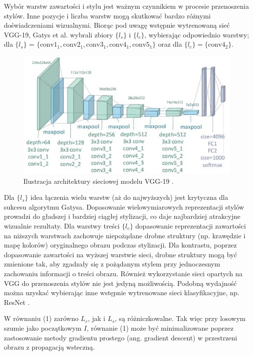 \documentclass[12pt]{article}
\begin{document}
Wybór warstw zawartości i stylu jest ważnym czynnikiem w procesie przenoszenia stylów. Inne pozycje i liczba warstw mogą skutkować bardzo różnymi doświadczeniami wizualnymi. Biorąc pod uwagę wstępnie wytrenowaną sieć VGG-19, Gatys et al. wybrali zbiory $\{l_s\}$ i $\{l_c\}$, wybierając odpowiednio warstwy; dla $\{l_s\}$ = $\{\text{conv}1_1, \text{conv}2_1, \text{conv}3_1, \text{conv}4_1, \text{conv}5_1\}$ oraz dla $\{l_c\} = \{\text{conv}4_2\}$.
\begin{figure}[H]
    \centering
    \includegraphics[scale=0.65]{u9.png}
    \caption{Ilustracja architektury sieciowej modelu VGG-19 \cite{31}.}
    \label{fig:6}
\end{figure}

Dla $\{l_s\}$ idea łączenia wielu warstw (aż do najwyższych) jest krytyczna dla sukcesu algorytmu Gatysa. Dopasowanie wielowymiarowych reprezentacji stylów prowadzi do gładszej i bardziej ciągłej stylizacji, co daje najbardziej atrakcyjne wizualnie rezultaty. Dla warstwy treści $\{l_c\}$ dopasowanie reprezentacji zawartości na niższych warstwach zachowuje niepożądane drobne struktury (np. krawędzie i mapę kolorów) oryginalnego obrazu podczas stylizacji. Dla kontrastu, poprzez dopasowanie zawartości na wyższej warstwie sieci, drobne struktury mogą być zmienione tak, aby zgadzały się z pożądanym stylem przy jednoczesnym zachowaniu informacji o treści obrazu. Również wykorzystanie sieci opartych na VGG do przenoszenia stylów nie jest jedyną możliwością. Podobną wydajność można uzyskać wybierając inne wstępnie wytrenowane sieci klasyfikacyjne, np. ResNet \cite{30}.

W równaniu (1) zarówno $L_c$, jak i $L_s$, są różniczkowalne. Tak więc przy losowym szumie jako początkowym $I$, równanie (1) może być minimalizowane poprzez zastosowanie metody gradientu prostego (ang. gradient descent) w przestrzeni obrazu z propagacją wsteczną.
\end{document}
